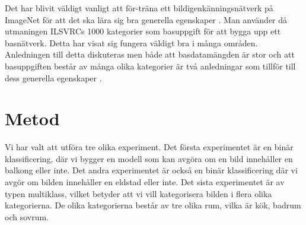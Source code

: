 \documentclass[]{kththesis}
\begin{document}
Det har blivit väldigt vanligt att för-träna ett bildigenkänningsnätverk på ImageNet för att det ska lära sig bra generella egenskaper \parencite{huh2016makes}. Man använder då utmaningen ILSVRCs 1000 kategorier som basuppgift för att bygga upp ett basnätverk. Detta har visat sig fungera väldigt bra i många områden. Anledningen till detta diskuteras men både att basdatamängden är stor och att basuppgiften består av många olika kategorier är två anledningar som tillför till dess generella egenskaper \parencite{huh2016makes}.

\chapter{Metod}
Vi har valt att utföra tre olika experiment. Det första experimentet är en binär klassificering, där vi bygger en modell som kan avgöra om en bild innehåller en balkong eller inte. Det andra experimentet är också en binär klassificering där vi avgör om bilden innehåller en eldstad eller inte. Det sista experimentet är av typen multiklass, vilket betyder att vi vill kategorisera bilden i flera olika kategorierna. De olika kategorierna består av tre olika rum, vilka är kök, badrum och sovrum.
\end{document}
